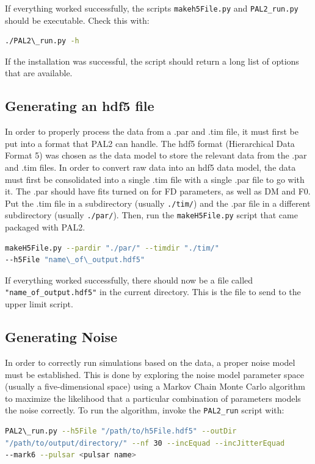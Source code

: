 \documentclass[12pt]{article}
\begin{document}
If everything worked successfully, the scripts \texttt{makeh5File.py} and
\texttt{PAL2\_run.py} should
be executable. Check this with:
\\
\begin{lstlisting}[language=bash]
./PAL2\_run.py -h
\end{lstlisting}
If the installation was successful, the script should return a long list of
options that are available.


\subsection*{Generating an hdf5 file}

In order to properly process the data from a .par and .tim file, it must first 
be put into a format that PAL2 can handle. The hdf5 format (Hierarchical Data
Format 5) was chosen as the data model to store the relevant data from the .par
and .tim files.
In order to convert raw data into an hdf5 data model, the data must first be
consolidated into a single .tim file with a single .par file to go with it. The
.par should have fits turned on for FD parameters, as well as DM and F0.
Put the .tim file in a subdirectory (usually \texttt{./tim/}) and the .par file in a
different subdirectory (usually \texttt{./par/}). Then, run the \texttt{makeH5File.py} script that
came packaged with PAL2.
\\
\begin{lstlisting}[language=bash]
makeH5File.py --pardir "./par/" --timdir "./tim/"
--h5File "name\_of\_output.hdf5"
\end{lstlisting}

If everything worked successfully, there should now be a file called
\texttt{"name\_of\_output.hdf5"} in the current directory. This is the file to send to the
upper limit script.

\subsection*{Generating Noise}

In order to correctly run simulations based on the data, a proper noise model
must be established. This is done by exploring the noise model parameter space
(usually a five-dimensional space) using a Markov Chain Monte Carlo algorithm to
maximize the likelihood that a particular combination of parameters models the
noise correctly. To run the algorithm, invoke the \texttt{PAL2\_run} script with:
\\
\begin{lstlisting}[language=bash]
PAL2\_run.py --h5File "/path/to/h5File.hdf5" --outDir
"/path/to/output/directory/" --nf 30 --incEquad --incJitterEquad
--mark6 --pulsar <pulsar name>
\end{lstlisting}
\end{document}
